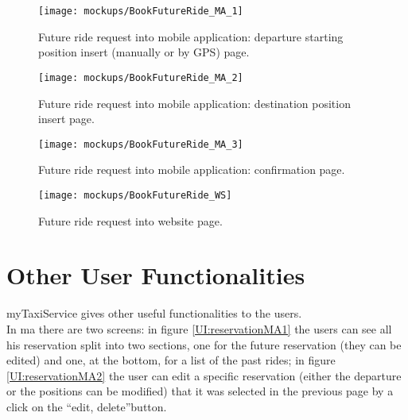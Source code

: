 \documentclass[\mainpath/main]{subfiles}
\begin{document}
\begin{figure}[ht!]
	\centering
	\begin{minipage}[t]{0.4\textwidth}
		\centering
		\texttt{[image: mockups/BookFutureRide\_MA\_1]}
		\caption[Future ride request part1 into mobile application.]{Future ride request into mobile application: departure starting position insert (manually or by GPS) page.}
		\label{UI:futuretimeMA1}
	\end{minipage}
	\hspace{1 cm}
	\begin{minipage}[t]{0.40\linewidth}
		\centering
		\texttt{[image: mockups/BookFutureRide\_MA\_2]}
		\caption[Future ride request part2 into mobile application.]{Future ride request into mobile application: destination position insert page.}
		\label{UI:futuretimeMA2}
	\end{minipage}
\end{figure}

\begin{figure}[ht!]
	\centering
	\begin{minipage}[t]{0.4\textwidth}
		\centering
		\texttt{[image: mockups/BookFutureRide\_MA\_3]}
		\caption[Future ride request part3 into mobile application.]{Future ride request into mobile application: confirmation page.}
		\label{UI:futuretimeMA3}
	\end{minipage}
	\hspace{1 cm}
	\begin{minipage}[t]{0.40\linewidth}
		\centering
		\texttt{[image: mockups/BookFutureRide\_WS]}
		\caption[Future ride request into website.]{Future ride request into website page.}
		\label{UI:futuretimeWS}
	\end{minipage}
\end{figure}

\section{Other User Functionalities}
myTaxiService gives other useful functionalities to the users.\\
In \gls{ma} there are two screens: in figure \ref{UI:reservationMA1} the users can see all his reservation split into two sections, one for the future reservation (they can be edited) and one, at the bottom, for a list of the past rides; in figure \ref{UI:reservationMA2} the user can edit a specific reservation (either the departure or the positions can be modified) that it was selected in the previous page by a click on the \textquotedblleft edit, delete\textquotedblright  button.\\
\end{document}
